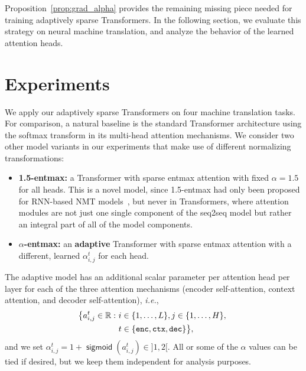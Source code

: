 \documentclass[11pt,a4paper]{article}
\makeatletter
\newcommand*{\ie}{\textit{i.\hspace{.07em}e.}\@\xspace}
\newcommand{\reals}{\mathbb{R}}
\DeclareMathOperator*{\sigmoid}{\mathsf{sigmoid}}
\newcommand*\entmaxtext{entmax\xspace}
\makeatother
\begin{document}
Proposition~\ref{prop:grad_alpha} provides the remaining missing
piece needed for training adaptively sparse Transformers. In the
following section, we evaluate this strategy on neural machine
translation, and analyze the behavior of the learned attention heads.

\section{Experiments}
We apply our adaptively sparse Transformers on four machine translation tasks.
For comparison, a natural baseline is the standard Transformer
architecture using the softmax transform in its multi-head attention mechanisms.
We consider two other model variants in our experiments that make use of different
normalizing transformations:

\begin{itemize}
\item \textbf{1.5-\entmaxtext:} a Transformer with sparse \entmaxtext
attention with fixed $\alpha=1.5$ for all heads. This is a novel model,
since 1.5-\entmaxtext{} had only been proposed for
RNN-based NMT models~\citep{entmax}, but never
in Transformers, where attention modules are not just one single
component of the seq2seq model but rather an integral part of all of
the model components.\item \textbf{\boldmath $\alpha$-\entmaxtext:} an \textbf{adaptive}
Transformer with sparse \entmaxtext attention with a different,
learned $\alpha_{i,j}^t$ for each head.
\end{itemize}

The adaptive model has an additional scalar parameter per attention head per
layer for each of the three attention mechanisms (encoder self-attention,
context attention, and decoder self-attention), \ie,
\begin{equation}
\begin{aligned}\hspace{-8pt}
\big \{ a_{i,j}^{t} \in \reals:~&
i \in \{1, \dots, L\},
j \in \{1, \dots, H\}, \\
& t \in \{\texttt{enc}, \texttt{ctx}, \texttt{dec}\} \big\},
\end{aligned}
\hspace{-5pt}
\end{equation}
and we set $\alpha_{i,j}^t = 1 + \sigmoid(a_{i,j}^t) \in ]1, 2[$.
All or some of the $\alpha$ values can be tied if desired, but we
keep them independent for analysis purposes.
\end{document}
